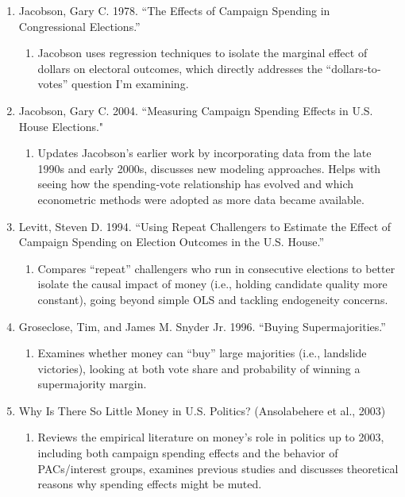 \documentclass[12pt]{article}
\begin{document}
\begin{enumerate}[label=\Alph*.]
    \item Jacobson, Gary C. 1978. “The Effects of Campaign Spending in Congressional Elections.”
    \begin{enumerate}[label=\arabic*)]
        \item Jacobson uses regression techniques to isolate the marginal effect of dollars on electoral outcomes, which directly addresses the “dollars‐to‐votes” question I'm examining.
    \end{enumerate}

    \item Jacobson, Gary C. 2004. “Measuring Campaign Spending Effects in U.S. House Elections."
    \begin{enumerate}[label=\arabic*)]
        \item Updates Jacobson’s earlier work by incorporating data from the late 1990s and early 2000s, discusses new modeling approaches. Helps with seeing how the spending‐vote relationship has evolved and which econometric methods were adopted as more data became available.
    \end{enumerate}

    \item Levitt, Steven D. 1994. “Using Repeat Challengers to Estimate the Effect of Campaign Spending on Election Outcomes in the U.S. House.” 
    \begin{enumerate}[label=\arabic*)]
        \item Compares “repeat” challengers who run in consecutive elections to better isolate the causal impact of money (i.e., holding candidate quality more constant), going beyond simple OLS and tackling endogeneity concerns.
    \end{enumerate}

    \item Groseclose, Tim, and James M. Snyder Jr. 1996. “Buying Supermajorities.”
    \begin{enumerate}[label=\arabic*)]
        \item Examines whether money can “buy” large majorities (i.e., landslide victories), looking at both vote share and probability of winning a supermajority margin.
    \end{enumerate}

    \item Why Is There So Little Money in U.S. Politics? (Ansolabehere et al., 2003)
    \begin{enumerate}[label=\arabic*)]
        \item Reviews the empirical literature on money’s role in politics up to 2003, including both campaign spending effects and the behavior of PACs/interest groups, examines previous studies and discusses theoretical reasons why spending effects might be muted.
    \end{enumerate}
\end{enumerate}
\end{document}

